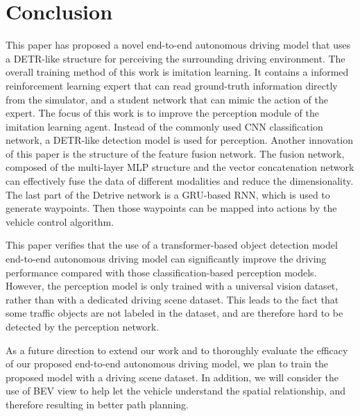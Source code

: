 \documentclass[conference]{IEEEtran}
\begin{document}
\section{Conclusion}

This paper has proposed a novel end-to-end autonomous driving model that uses a DETR-like structure for perceiving the surrounding driving environment. The overall training method of this work is imitation learning. It contains a informed reinforcement learning expert that can read ground-truth information directly from the simulator, and a student network that can mimic the action of the expert. The focus of this work is to improve the perception module of the imitation learning agent. Instead of the commonly used CNN classification network, a DETR-like detection model is used for perception. Another innovation of this paper is the structure of the feature fusion network. The fusion network, composed of the multi-layer MLP structure and the vector concatenation network can effectively fuse the data of different modalities and reduce the dimensionality. The last part of the Detrive network is a GRU-based RNN, which is used to generate waypoints. Then those waypoints can be mapped into actions by the vehicle control algorithm.

This paper verifies that the use of a transformer-based object detection model end-to-end autonomous driving model can significantly improve the driving performance compared with those classification-based perception models. However, the perception model is only trained with a universal vision dataset, rather than with a dedicated driving scene dataset. This leads to the fact that some traffic objects are not labeled in the dataset, and are therefore hard to be detected by the perception network.

As a future direction to extend our work and to thoroughly evaluate the efficacy of our proposed end-to-end autonomous driving model, we plan to train the proposed model with a driving scene dataset. In addition, we will consider the use of BEV view to help let the vehicle understand the spatial relationship, and therefore resulting in better path planning.

\printbibliography
\end{document}

